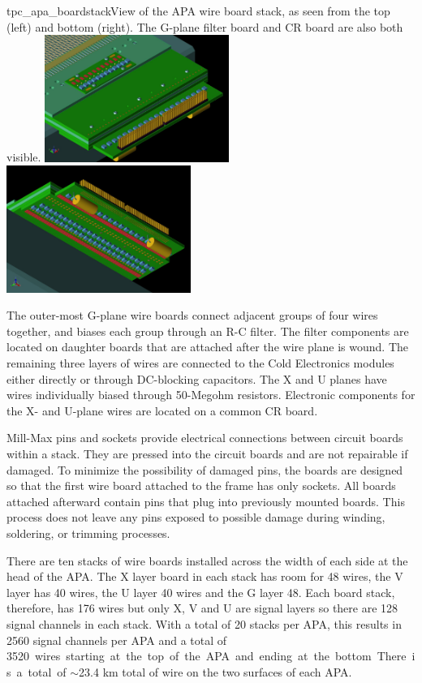 \begin{cdrfigure}{tpc_apa_boardstack}{View of the APA wire board stack, as seen from the top (left) and bottom (right).  The G-plane filter board and CR board are also both visible.}
\includegraphics[width=0.45\textwidth]{figures/tpc_apa_boardstack_top.png}
\includegraphics[width=0.45\textwidth]{figures/tpc_apa_boardstack_bottom.png}
\end{cdrfigure}

The outer-most G-plane wire boards connect adjacent groups of four wires together, and biases each group through an R-C filter. The filter components are located on daughter boards that are attached after the wire plane is wound. The remaining three layers of wires are connected to the Cold Electronics modules either directly or through DC-blocking capacitors. The X and U planes have wires individually biased through 50-Megohm resistors. Electronic components for the X- and U-plane wires are located on a common CR board.

Mill-Max pins and sockets provide electrical connections between circuit boards within a stack. They are pressed into the circuit boards and are not repairable if damaged. To minimize the possibility of damaged pins, the boards are designed so that the first wire board attached to the frame has only sockets. All boards attached afterward contain pins that plug into previously mounted boards. This process does not leave any pins exposed to possible damage during winding, soldering, or trimming processes.

There are ten stacks of wire boards installed across the width of each side at the head of the APA.  The X layer board in each stack has room for 48 wires, the V layer has 40 wires, the U layer 40 wires and the G layer 48.  Each board stack, therefore, has 176 wires but only X, V and U are signal layers so there are 128 signal channels in each stack.  With a total of 20 stacks per APA, this results in 2560 signal channels per APA and a total of \SI{3520} wires starting at the top of the APA and ending at the bottom.  There is a total of $\sim$23.4 km total of wire on the two surfaces of each APA.  

